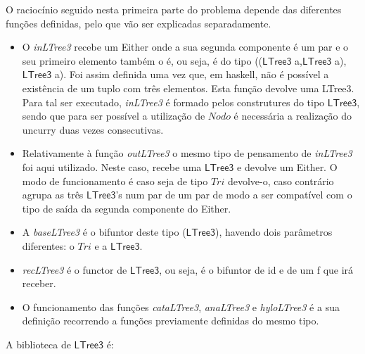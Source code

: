 \documentclass[a4paper]{article}
\newcommand{\Conid}[1]{\mathit{#1}}
\begin{document}
O raciocínio seguido nesta primeira parte do problema depende das diferentes funções definidas, pelo que vão ser explicadas separadamente.
\begin{itemize}
\item O \emph{inLTree3} recebe um Either onde a sua segunda componente é um par e o seu primeiro elemento também o é, ou seja, é do tipo ((\ensuremath{\mathsf{LTree3}} a,\ensuremath{\mathsf{LTree3}} a),\ensuremath{\mathsf{LTree3}} a). Foi assim definida uma vez que, em haskell, não é possível a existência de um tuplo com três elementos. Esta função devolve uma LTree3. Para tal ser executado, \emph{inLTree3} é formado pelos construtures do tipo \ensuremath{\mathsf{LTree3}}, sendo que para ser possível a utilização de \ensuremath{\Conid{Nodo}} é necessária a realização do uncurry duas vezes consecutivas.
\item Relativamente à função \emph{outLTree3} o mesmo tipo de pensamento de \emph{inLTree3} foi aqui utilizado. Neste caso, recebe uma \ensuremath{\mathsf{LTree3}} e devolve um Either. O modo de funcionamento é caso seja de tipo \ensuremath{\Conid{Tri}} devolve-o, caso contrário agrupa as três \ensuremath{\mathsf{LTree3}}'s num par de um par de modo a ser compatível com o tipo de saída da segunda componente do Either.
\item A \emph{baseLTree3} é o bifuntor deste tipo (\ensuremath{\mathsf{LTree3}}), havendo dois parâmetros diferentes: o \ensuremath{\Conid{Tri}} e a \ensuremath{\mathsf{LTree3}}.
\item \emph{recLTree3} é o functor de \ensuremath{\mathsf{LTree3}}, ou seja, é o bifuntor de id e de um f que irá receber.
\item O funcionamento das funções \emph{cataLTree3}, \emph{anaLTree3} e \emph{hyloLTree3} é a sua definição recorrendo a funções previamente definidas do mesmo tipo.
\end{itemize}
A biblioteca de \ensuremath{\mathsf{LTree3}} é:
\end{document}
